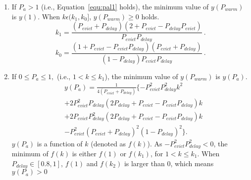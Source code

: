 \begin{enumerate}


  \item If $P_{a} > 1$ (i.e., Equation~\ref{equ:pal1} holds), the minimum value of $y(P_{warm})$ is $y(1)$.
  When $k \epsilon (k_{1}, k_{0}]$, $y(P_{warm}) \geq 0$ holds.
    \begin{equation}
    \label{equ:pal1}
     k_{1} = \frac{(P_{evict}+P_{delay})(2+P_{evict}-P_{delay}P_{evict})}{P_{evict}P_{delay}} \ .
  \end{equation}
  \begin{equation}
   k_{0} = \frac{(1 + P_{evict}- P_{evict}P_{delay})(P_{evict}+P_{delay})}{(1 - P_{delay})P_{evict}P_{delay}}\ .
  \end{equation}


  \item If $0 \leq P_{a} \leq 1,$ (i.e., $1 < k \leq k_{1}$), the minimum value of $y(P_{warm})$ is $y(P_{a})$.
  \begin{equation}\begin{split}
    &y(P_{a}) = \frac{1}{4(P_{evict}+P_{delay})}\{-P_{evict}^{2}P_{delay}^{2}k^{2}\\ 
    &+ 2P_{evict}^{2}P_{delay}(2P_{delay}+P_{evict}-P_{evict}P_{delay})k\\ 
    &+ 2P_{evict}P_{delay}^{2}(2P_{delay}+P_{evict}-P_{evict}P_{delay})k\\ 
    & - P_{evict}^{2}(P_{evict}+P_{delay})^{2}(1-P_{delay})^{2}\}.
  \end{split}\end{equation}
 $y(P_{a})$ is a function of $k$ (denoted as $f(k)$). As $-P_{evict}^{2}P_{delay}^{2} < 0$, the minimum of $f(k)$ is either $f(1)$ or $f(k_{1})$, for $1 < k \leq k_{1}$. When $P_{delay} \in [0.8,1]$, $f(1)$ and  $f(k_{2})$ is larger than $0$, which means $y(P_{a}) > 0$


\end{enumerate}
